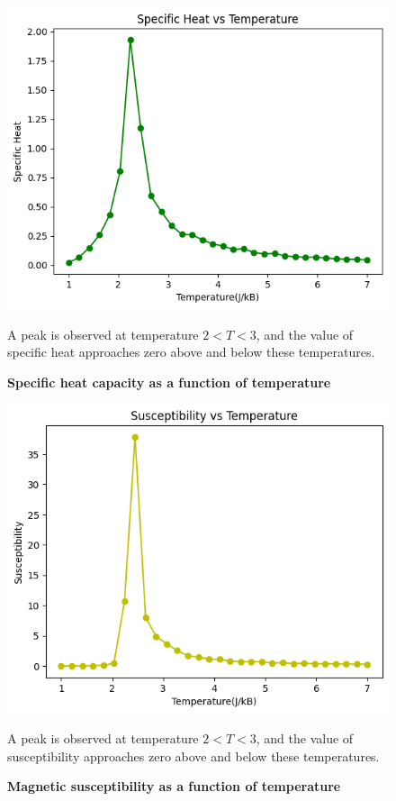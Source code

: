 \documentclass{article}
\begin{document}
\begin{figure}[h]
    \centering
    \includegraphics[scale=0.8]{spcheatvstemp.png}
    \caption{\textbf{Specific heat capacity as a function of temperature}}
    \label{fig:specific_heat_vs_temp}
A peak is observed at temperature $2 < T < 3$, and the value of specific heat approaches zero above and below these temperatures.
\end{figure}


\begin{figure}[h]
    \centering
    \includegraphics[scale=0.8]{susceptibilityvstemp.png}
    \caption{\textbf{Magnetic susceptibility as a function of temperature}}
    \label{fig:magnetic_susceptibility_vs_temp}
A peak is observed at temperature $2 < T < 3$, and the value of susceptibility approaches zero above and below these temperatures.
\end{figure}
\end{document}

